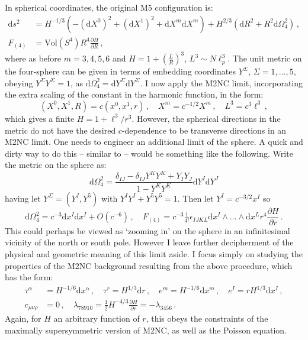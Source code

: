 \documentclass[11pt]{article}
\newcommand{\be}{\begin{equation}}
\newcommand{\ee}{\end{equation}}
\newcommand{\dd}{\mathrm{d}}
\numberwithin{equation}{section}
\begin{document}
{{In spherical coordinates, the original M5 configuration is:
\be
\label{M5}
\begin{split} 
\dd s^2  & = H^{-1/3} ( - (\dd X^0)^2 + (\dd X^1)^2 + \dd X^m \dd X^m ) 
+ H^{2/3} ( \dd R^2 + R^2 \dd \Omega_4^2)  \,,\\[4pt]
F_{(4)} & = \mathrm{Vol}(S^4) R^4 \frac{\partial H}{\partial R}\,,
\end{split}
\ee
where as before $m=3,4,5,6$ and $H = 1 + \left( \frac{L}{R} \right)^3$, $L^3 \sim N \ell_p^3$.
The unit metric on the four-sphere can be given in terms of embedding coordinates $Y^\Sigma$, $\Sigma=1,\dots,5$, obeying $Y^\Sigma Y^\Sigma = 1$, as $\dd \Omega_4^2 = \dd Y^\Sigma \dd Y^\Sigma$.
I now apply the M2NC limit, incorporating the extra scaling of the constant in the harmonic function, in the form:
\be
(X^0,X^1,R) = c (x^0,x^1,r) \,,\quad
X^m = c^{-1/2} X^m \,,\quad L^3 = c^3 \ell^3 \,,
\ee
which gives a finite $H = 1 + \ell^3/r^3$.
However, the spherical directions in the metric do not have the desired $c$-dependence to be transverse directions in an M2NC limit.
One needs to engineer an additional limit of the sphere.
A quick and dirty way to do this -- similar to \cite{Fontanella:2024kyl,Fontanella:2024rvn} --  would be something like the following.
Write the metric on the sphere as:
\be
\dd \Omega_4^2 = \frac{ \delta_{IJ} - \delta_{IJ} Y^K Y^K + Y_I Y_J}{1-Y^K Y^K} \dd Y^I \dd Y^J 
\ee
having let $Y^\Sigma=(Y^I, Y^5)$ with $Y^I Y^I + Y^5 Y^5 = 1$.
Then let $Y^I = c^{-3/2} x^I$ so
\be
\dd \Omega_4^2 = c^{-3} \dd x^I \dd x^I+ O(c^{-6}) 
\,,\quad
F_{(4)} = c^{-3} \tfrac{1}{4!} \epsilon_{IJKL} \dd x^I \wedge \dots \wedge \dd x^L r^4 \frac{\partial H}{\partial r} \,.
\ee
This could perhaps be viewed as `zooming in' on the sphere in an infinitesimal vicinity of the north or south pole. However I leave further decipherment of the physical and geometric meaning of this limit aside.
I focus simply on studying the properties of the M2NC background resulting from the above procedure, which has the form:
\be
\begin{split}
\tau^\alpha &= H^{-1/6} \dd x^\alpha \,,\quad
\tau^r = H^{1/3} \dd r \,,\quad
e^m = H^{-1/6} \dd x^m \,,\quad
e^I = r H^{1/3} \dd x^I \,,
\\[4pt]
c_{\mu\nu\rho} &= 0 \,,\quad
\lambda_{789 10} = \tfrac12 H^{-4/3} \frac{\partial H}{\partial r}  = - \lambda_{3456} \,.
\end{split}
\ee
Again, for $H$ an arbitrary function of $r$, this obeys the constraints of the maximally supersymmetric version of M2NC, as well as the Poisson equation.
}}
\end{document}
